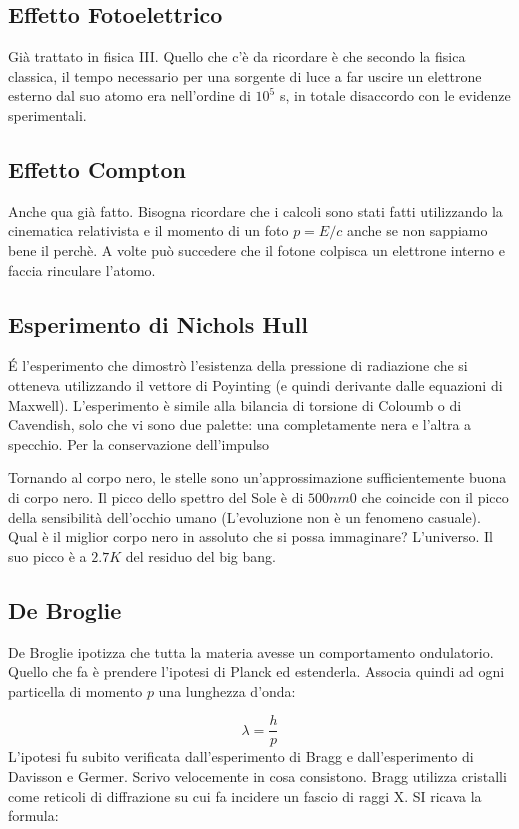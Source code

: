 \documentclass[11pt,a4paper]{article}
\begin{document}
\subsection{Effetto Fotoelettrico}
Già trattato in fisica III. Quello che c'è da ricordare è che secondo la fisica classica, il tempo necessario per una sorgente di luce a far uscire un elettrone esterno dal suo atomo era nell'ordine di $ 10^5 $ s, in totale disaccordo con le evidenze sperimentali.

\subsection{Effetto Compton}
Anche qua già fatto. Bisogna ricordare che i calcoli sono stati fatti utilizzando la cinematica relativista e il momento di un foto $ p = E/c $ anche se non sappiamo bene il perchè. A volte può succedere che il fotone colpisca un elettrone interno e faccia rinculare l'atomo.

\subsection{Esperimento di Nichols Hull}
\'E l'esperimento che dimostrò l'esistenza della pressione di radiazione che si otteneva utilizzando il vettore di Poyinting (e quindi derivante dalle equazioni di Maxwell).
L'esperimento è simile alla bilancia di torsione di Coloumb o di Cavendish, solo che vi sono due palette: una completamente nera e l'altra a specchio.
Per la conservazione dell'impulso

Tornando al corpo nero, le stelle sono un'approssimazione sufficientemente buona di corpo nero. Il picco dello spettro del Sole è di $ 500nm 0$ che coincide con il picco della sensibilità dell'occhio umano (L'evoluzione non è un fenomeno casuale).
Qual  è il miglior corpo nero in assoluto che si possa immaginare? L'universo. Il suo picco è a $ 2.7 K $ del residuo del big bang.

\subsection{De Broglie}
De Broglie ipotizza che tutta la materia avesse un comportamento ondulatorio. Quello che fa è prendere l'ipotesi di Planck ed estenderla. Associa quindi ad ogni particella di momento $ p $ una lunghezza d'onda:

\begin{equation}
\lambda = \frac{h}{p}
\end{equation}
L'ipotesi fu subito verificata dall'esperimento di Bragg e dall'esperimento di Davisson e Germer. Scrivo velocemente in cosa consistono. Bragg utilizza cristalli come reticoli di diffrazione su cui fa incidere un fascio di raggi X. SI ricava la formula:
\end{document}
